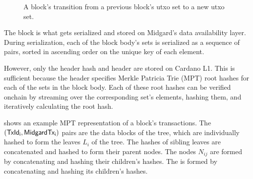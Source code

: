 \documentclass[../midgard.tex]{subfiles}
\begin{document}
\begin{figure}[htb] %
    \centering %
    \caption[Block transition]{A block's transition from a previous block's utxo set to a new utxo set.}
    \label{fig:block-transition}
\end{figure}

The block is what gets serialized and stored on Midgard's data availability layer.
During serialization, each of the block body's sets is serialized as a sequence of pairs, sorted in ascending order on the unique key of each element.

However, only the header hash and header are stored on Cardano L1.
This is sufficient because the header specifies Merkle Patricia Trie (MPT) root hashes for each of the sets in the block body.
Each of these root hashes can be verified onchain by streaming over the corresponding set's elements, hashing them, and iteratively calculating the root hash.

 shows an example MPT representation of a block's transactions.
The $(\mathsf{TxId_i}, \mathsf{MidgardTx_i})$ pairs are the data blocks of the tree, which are individually hashed to form the leaves $L_i$ of the tree.
The hashes of sibling leaves are concatenated and hashed to form their parent nodes.
The nodes $N_{ij}$ are formed by concatenating and hashing their children's hashes.
The  is formed by concatenating and hashing its children's hashes.
\end{document}

